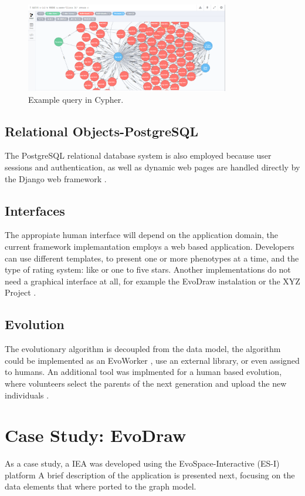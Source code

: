   \begin{figure}[!t]
    \centering
        \includegraphics[width=3.5in]{img/gui-neo.png}
    \caption{Example query in Cypher.}
    \label{fig:cypher}
  \end{figure}

\subsection{Relational Objects-PostgreSQL}
  The PostgreSQL relational database system is also employed because user 
  sessions and authentication,
  as well as dynamic web pages are handled directly by the Django web
  framework \cite{garcia2013evospace}. %

\subsection{Interfaces}
The appropiate human interface will depend on the application domain, 
the current framework implemantation employs a web based application. Developers 
can use different templates, to present one or more phenotypes 
at a time, and the type of rating system: like or one to five stars. 
Another implementations do not need a graphical interface at all, for example the
EvoDraw instalation or the XYZ Project \cite{de2014artists}.   
    
\subsection{Evolution}
The evolutionary algorithm is decoupled from the data model, the algorithm 
could be implemented as an EvoWorker \cite{garcia2013evospace}, use an external library, 
or even assigned to humans. An additional tool was implmented for a human based evolution, 
where volunteers select the parents of the next generation and upload the 
new individuals \cite{de2014artists}.  


\section{Case Study: EvoDraw}
As a case study, a IEA was developed using the 
EvoSpace-Interactive (ES-I) platform \cite{garcia2013evospace}
A brief description of the application is presented next, focusing
on the data elements that where ported to the graph model.

